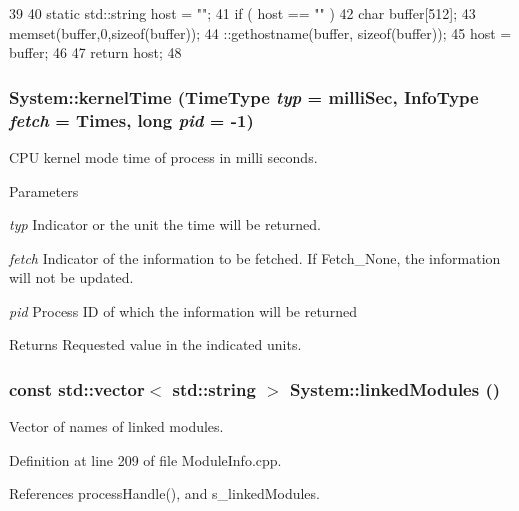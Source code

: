 \begin{DoxyCode}
39                                   {
40   static std::string host = "";
41   if ( host == "" ) {
42     char buffer[512];
43     memset(buffer,0,sizeof(buffer));
44     ::gethostname(buffer, sizeof(buffer));
45     host = buffer;
46   }
47   return host;
48 }
\end{DoxyCode}
\hypertarget{namespaceSystem_a52400aecb0f63c891b51bc958ea064e9}{
\subsubsection[{kernelTime}]{ System::kernelTime (TimeType {\em typ} = {\ttfamily milliSec}, \/  InfoType {\em fetch} = {\ttfamily Times}, \/  long {\em pid} = {\ttfamily -\/1})}}
\label{namespaceSystem_a52400aecb0f63c891b51bc958ea064e9}
CPU kernel mode time of process in milli seconds. 
\begin{DoxyParams}{Parameters}
\item[{\em typ}]Indicator or the unit the time will be returned. \item[{\em fetch}]Indicator of the information to be fetched. If Fetch\_\-None, the information will not be updated. \item[{\em pid}]Process ID of which the information will be returned \end{DoxyParams}
\begin{DoxyReturn}{Returns}
Requested value in the indicated units. 
\end{DoxyReturn}
\hypertarget{namespaceSystem_af1b504f8287b1957eeab91fb89cbd56f}{
\subsubsection[{linkedModules}]{\setlength{\rightskip}{0pt plus 5cm}const std::vector$<$ std::string $>$ System::linkedModules ()}}
\label{namespaceSystem_af1b504f8287b1957eeab91fb89cbd56f}


Vector of names of linked modules. 

Definition at line 209 of file ModuleInfo.cpp.

References processHandle(), and s\_\-linkedModules.


